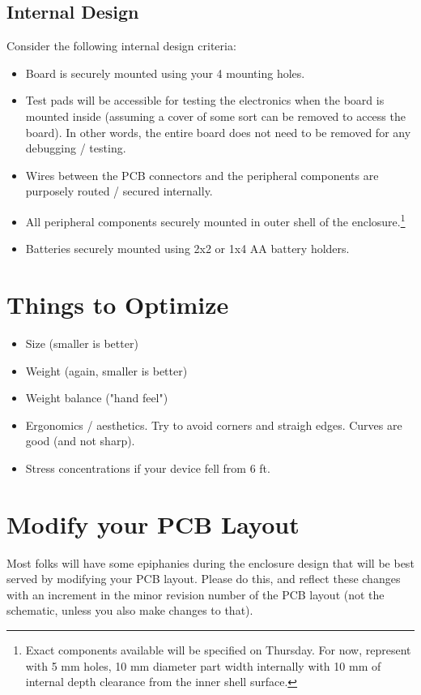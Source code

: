\documentclass[10pt]{article}
\begin{document}
\subsection{Internal Design}
Consider the following internal design criteria:
\begin{itemize}
    \item Board is securely mounted using your 4 mounting holes.
    \item Test pads will be accessible for testing the electronics when the
        board is mounted inside (assuming a cover of some sort can be removed
        to access the board).  In other words, the entire board does not need
        to be removed for any debugging / testing.
    \item Wires between the PCB connectors and the peripheral components are
        purposely routed / secured internally.
    \item All peripheral components securely mounted in outer shell of the
        enclosure.\footnote{Exact components available will be specified on
        Thursday.  For now, represent with 5 mm holes, 10 mm diameter part
        width internally with 10 mm of internal depth clearance from the inner
        shell surface.}
    \item Batteries securely mounted using 2x2 or 1x4 AA battery holders.
\end{itemize}

\section{Things to Optimize}
\begin{itemize}
    \item Size (smaller is better)
    \item Weight (again, smaller is better)
    \item Weight balance ("hand feel")
    \item Ergonomics / aesthetics.  Try to avoid corners and straigh edges.
        Curves are good (and not sharp).
    \item Stress concentrations if your device fell from 6 ft.
\end{itemize}

\section{Modify your PCB Layout}
Most folks will have some epiphanies during the enclosure design that will be
best served by modifying your PCB layout.  Please do this, and reflect these
changes with an increment in the minor revision number of the PCB layout (not
the schematic, unless you also make changes to that).
\end{document}
